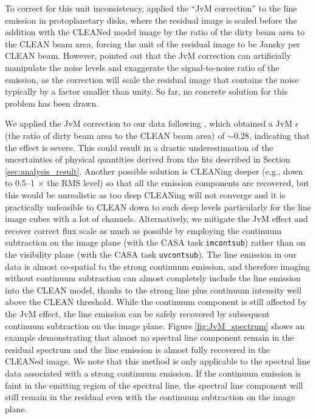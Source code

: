 \documentclass[twocolumn, twocolappendix, astrosymb, times]{aastex631}
\begin{document}
To correct for this unit inconsistency, \citet{Czekala2021} applied the ``JvM correction'' to the line emission in protoplanetary disks, where the residual image is scaled before the addition with the CLEANed model image by the ratio of the dirty beam area to the CLEAN beam area, forcing the unit of the residual image to be Jansky per CLEAN beam. However, \citet{Casassus2022} pointed out that the JvM correction can artificially manipulate the noise levels and exaggerate the signal-to-noise ratio of the emission, as the correction will scale the residual image that contains the noise typically by a factor smaller than unity. So far, no concrete solution for this problem has been drawn.

We applied the JvM correction to our data following \citet{Czekala2021}, which obtained a JvM $\epsilon$ (the ratio of dirty beam area to the CLEAN beam area) of $\sim0.28$, indicating that the effect is severe. This could result in a drastic underestimation of the uncertainties of physical quantities derived from the fits described in Section \ref{sec:analysis_result}. Another possible solution is CLEANing deeper (e.g., down to 0.5--1 $\times$ the RMS level) so that all the emission components are recovered, but this would be unrealistic as too deep CLEANing will not converge and it is practically unfeasible to CLEAN down to such deep levels particularly for the line image cubes with a lot of channels. Alternatively, we mitigate the JvM effect and recover correct flux scale as much as possible by employing the continuum subtraction on the image plane (with the CASA task \texttt{imcontsub}) rather than on the visibility plane (with the CASA task \texttt{uvcontsub}). The line emission in our data is almost co-spatial to the strong continuum emission, and therefore imaging without continuum subtraction can almost completely include the line emission into the CLEAN model, thanks to the strong line plus continuum intensity well above the CLEAN threshold. While the continuum component is still affected by the JvM effect, the line emission can be safely recovered by subsequent continuum subtraction on the image plane. Figure \ref{fig:JvM_spectrum} shows an example demonstrating that almost no spectral line component remain in the residual spectrum and the line emission is almost fully recovered in the CLEANed image. We note that this method is only applicable to the spectral line data associated with a strong continuum emission. If the continuum emission is faint in the emitting region of the spectral line, the spectral line component will still remain in the residual even with the continuum subtraction on the image plane. 
\end{document}
